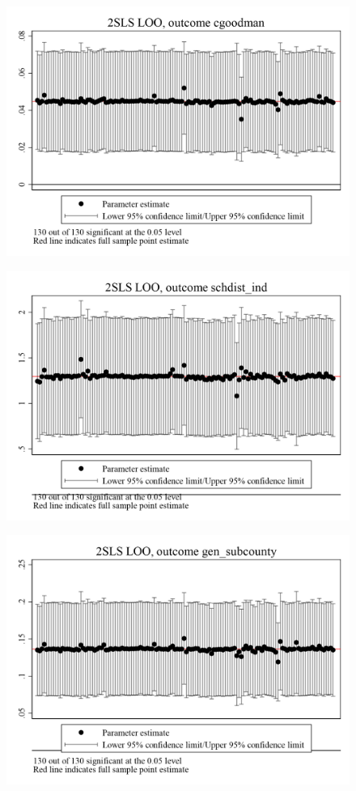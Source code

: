 \documentclass{article}
\begin{document}
\begin{figure}
	\centering
	\includegraphics[width=.8\textwidth]{figures/exogeneity_tests/loo_iv_cgoodman.png}
\end{figure}
\clearpage
\begin{figure}
	\centering
	\includegraphics[width=.8\textwidth]{figures/exogeneity_tests/loo_iv_schdist_ind.png}
\end{figure}
\clearpage
\begin{figure}
	\centering
	\includegraphics[width=.8\textwidth]{figures/exogeneity_tests/loo_iv_gen_subcounty.png}
\end{figure}
\end{document}
